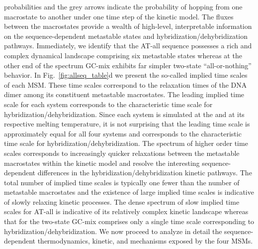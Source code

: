 \documentclass[journal=jpcbfk,manuscript=article]{achemso}
\newcommand*{\roodr}[1]{{\color{red}{#1}}}
\begin{document}
probabilities and the grey arrows indicate the probability of hopping from one macrostate to another under one time step of the kinetic model. The fluxes between the macrostates provide a wealth of high-level, interpretable information on the sequence-dependent metastable states and hybridization/dehybridization pathways. Immediately, we identify that the AT-all sequence possesses a rich and complex dynamical landscape comprising six metastable states whereas at the other end of the spectrum GC-mix exhibits far simpler two-state ``all-or-nothing'' behavior. In Fig.~\ref{fig:allseq_table}d we present the so-called implied time scales of each MSM. These time scales correspond to the relaxation times of the DNA dimer among its constituent metastable macrostates. The leading implied time scale for each system corresponds to the characteristic time scale for hybridization/dehybridization. Since each system is simulated at the \roodr{same 7 mM concentration} and at its respective melting temperature, it is not surprising that the leading time scale is approximately equal for all four systems and corresponds to the characteristic time scale for hybridization/dehybridization. The spectrum of higher order time scales corresponds to increasingly quicker relaxations between the metastable macrostates within the kinetic model and resolve the interesting sequence-dependent differences in the hybridization/dehybridization kinetic pathways. The total number of implied time scales is typically one fewer than the number of metastable macrostates and the existence of large implied time scales is indicative of slowly relaxing kinetic processes. The dense spectrum of slow implied time scales for AT-all is indicative of its relatively complex kinetic landscape whereas that for the two-state GC-mix comprises only a single time scale corresponding to hybridization/dehybridization. We now proceed to analyze in detail the sequence-dependent thermodynamics, kinetic, and mechanisms exposed by the four MSMs.
\end{document}
